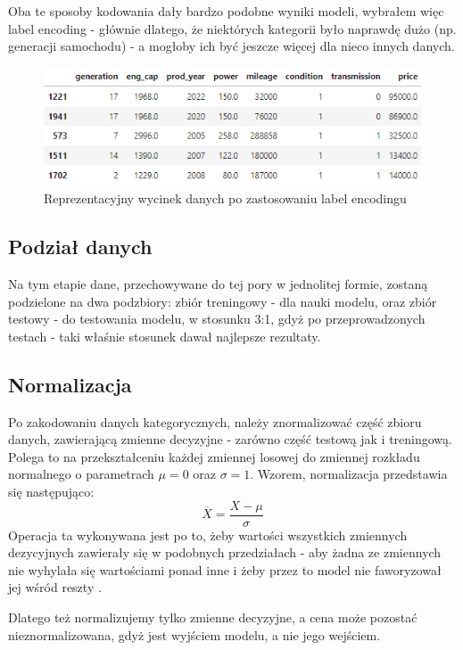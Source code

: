 \documentclass{article}
\begin{document}
Oba te sposoby kodowania dały bardzo podobne wyniki modeli, wybrałem więc label encoding - głównie dlatego, że niektórych kategorii było naprawdę dużo (np. generacji samochodu) - a mogłoby ich być jeszcze więcej dla nieco innych danych.

\begin{figure}[H]
    \centering
    \includegraphics[width=1\linewidth]{images/reprezentacyjny_wycinek_danych_z_label_encoding.png}
    \caption{Reprezentacyjny wycinek danych po zastosowaniu label encodingu}
\end{figure}

\subsection{Podział danych}
Na tym etapie dane, przechowywane do tej pory w jednolitej formie, zostaną podzielone na dwa podzbiory: zbiór treningowy - dla nauki modelu, oraz zbiór testowy - do testowania modelu, w stosunku 3:1, gdyż po przeprowadzonych testach - taki właśnie stosunek dawał najlepsze rezultaty.

\subsection{Normalizacja}
Po zakodowaniu danych kategorycznych, należy znormalizować część zbioru danych, zawierającą zmienne decyzyjne - zarówno część testową jak i treningową. Polega to na przekształceniu każdej zmiennej losowej do zmiennej rozkładu normalnego o parametrach $\mu=0$ oraz $\sigma=1$. Wzorem, normalizacja przedstawia się następująco:
\begin{equation}
    \overline{X}=\frac{X-\mu}{\sigma}
\end{equation}
Operacja ta wykonywana jest po to, żeby wartości wszystkich zmiennych dezycyjnych zawierały się w podobnych przedziałach - aby żadna ze zmiennych nie wyhylała się wartościami ponad inne i żeby przez to model nie faworyzował jej wśród reszty \cite{normalization}.

Dlatego też normalizujemy tylko zmienne decyzyjne, a cena może pozostać nieznormalizowana, gdyż jest wyjściem modelu, a nie jego wejściem.
\end{document}
